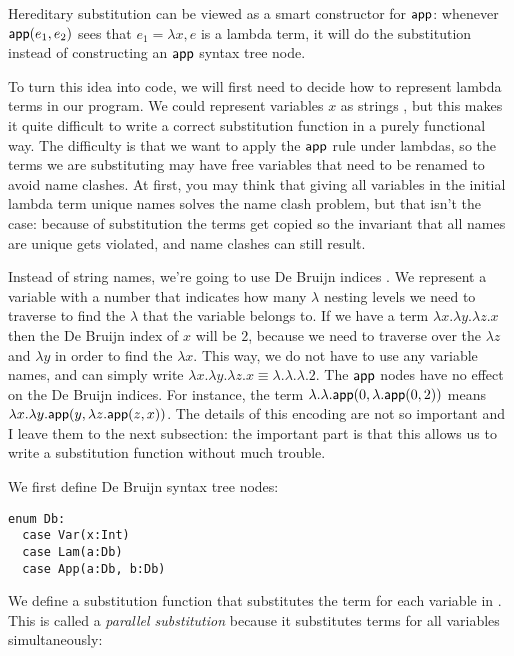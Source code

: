 Hereditary substitution can be viewed as a smart constructor for $\mathsf{app}$: whenever $\mathsf{app}(e_1,e_2)$ sees that $e_1 = \lambda x, e$ is a lambda term, it will do the substitution instead of constructing an $\mathsf{app}$ syntax tree node.

To turn this idea into code, we will first need to decide how to represent lambda terms in our program.
We could represent variables $x$ as strings , but this makes it quite difficult to write a correct substitution function in a purely functional way.
The difficulty is that we want to apply the $\mathsf{app}$ rule under lambdas, so the terms we are substituting may have free variables that need to be renamed to avoid name clashes.
At first, you may think that giving all variables in the initial lambda term unique names solves the name clash problem, but that isn't the case: because of substitution the terms get copied so the invariant that all names are unique gets violated, and name clashes can still result.

Instead of string names, we're going to use De Bruijn indices \cite{BruijnIndex2021}.
We represent a variable with a number that indicates how many $\lambda$ nesting levels we need to traverse to find the $\lambda$ that the variable belongs to.
If we have a term $\lambda x. \lambda y. \lambda z. x$ then the De Bruijn index of $x$ will be $2$, because we need to traverse over the $\lambda z$ and $\lambda y$ in order to find the $\lambda x$.
This way, we do not have to use any variable names, and can simply write $\lambda x. \lambda y. \lambda z. x \equiv \lambda. \lambda. \lambda. 2$.
The $\mathsf{app}$ nodes have no effect on the De Bruijn indices.
For instance, the term $\lambda. \lambda. \mathsf{app}(0,\lambda. \mathsf{app}(0,2))$ means $\lambda x. \lambda y. \mathsf{app}(y, \lambda z. \mathsf{app}(z,x))$.
The details of this encoding are not so important and I leave them to the next subsection: the important part is that this allows us to write a substitution function without much trouble.



We first define De Bruijn syntax tree nodes:
\begin{lstlisting}
enum Db:
  case Var(x:Int)
  case Lam(a:Db)
  case App(a:Db, b:Db)
\end{lstlisting}

We define a substitution function  that substitutes the term  for each variable  in . This is called a \emph{parallel substitution} because it substitutes terms for all variables simultaneously:

